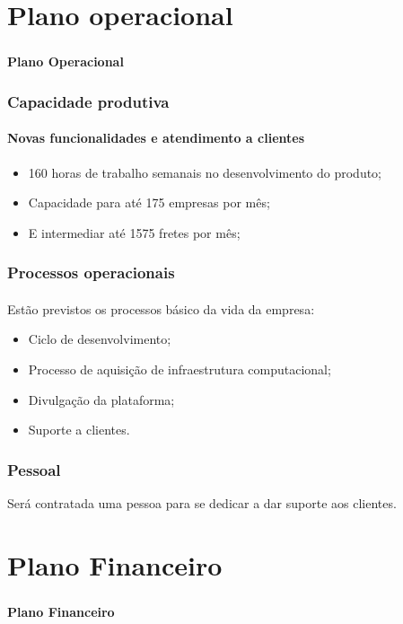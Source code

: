 \documentclass{beamer}
\begin{document}
\section{Plano operacional}
\begin{frame}
  \frametitle{}
  \framesubtitle{}

  \begin{center}
    {\huge\textbf{Plano Operacional}}
  \end{center}
\end{frame}

\begin{frame}
  \frametitle{Capacidade produtiva}
  \framesubtitle{Novas funcionalidades e atendimento a clientes}

  \begin{itemize}
    \item 160 horas de trabalho semanais no desenvolvimento do produto;
    \item Capacidade para até 175 empresas por mês;
    \item E intermediar até 1575 fretes por mês;
  \end{itemize}

\end{frame}

\begin{frame}
  \frametitle{Processos operacionais}
  \framesubtitle{}

  Estão previstos os processos básico da vida da empresa:
  \begin{itemize}
    \item Ciclo de desenvolvimento;
    \item Processo de aquisição de infraestrutura computacional;
    \item Divulgação da plataforma;
    \item Suporte a clientes.
  \end{itemize}

\end{frame}

\begin{frame}
  \frametitle{Pessoal}

  Será contratada uma pessoa para se dedicar a dar suporte aos clientes.

\end{frame}

\section{Plano Financeiro}
\begin{frame}
  \frametitle{}
  \framesubtitle{}

  \begin{center}
    {\huge\textbf{Plano Financeiro}}
  \end{center}
\end{frame}
\end{document}
